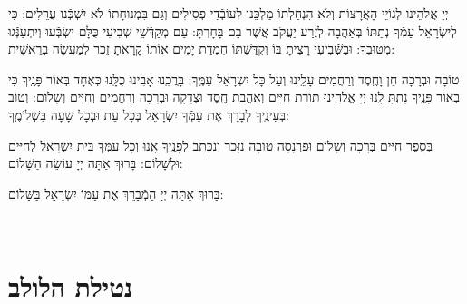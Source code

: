 \documentclass[twoside, openany, parskip=half, 11pt]{book}
\begin{document}
 יְיָ אֱלֹהֵינוּ לְגוֹיֵי הָאֲרָצוֹת וְלֹא הִנְחַלְתּוֹ מַלְכֵּנוּ לְעוֹבְֿדֵי פְסִילִים וְגַם בִּמְנוּחָתוֹ לֹא יִשְׁכְּֿנוּ עֲרֵלִים: כִּי לְיִשְׂרָאֵל עַמְּֿךָ נְתַתּוֹ בְּאַהֲבָה לְזֶרַע יַעֲקֹב אֲשֶׁר בָּם בָּחָרְתָּ: עַם מְקַדְּֿשֵׁי שְׁבִיעִי כֻּלָּם יִשְׂבְּֿעוּ וְיִתְעַנְּֿגוּ מִטּוּבֶךָ: וּבַשְּֿׁבִיעִי רָצִיתָ בּוֹ וְקִדַּשְׁתּוֹ חֶמְדַּת יָמִים אוֹתוֹ קָרָאתָ זֵכֶר לְמַעֲשֵׂה בְרֵאשִׁית:
  
\shabboskiddushhayom

\retzeh

\yaalehveyavo

\zion


\modim

\shabboschanukah

\shabboshodos  

\clearpage

\bircaskohanim

\newcommand{\shabbossimshalom}{
\firstword{שִׂים שָׁלוֹם}
 טוֹבָה וּבְרָכָה חֵן וָחֶֽסֶד וְרַחֲמִים עָלֵֽינוּ וְעַל כָּל יִשְׂרָאֵל עַמֶּֽךָ: בָּרֲכֵֽנוּ אָבִֽינוּ כֻּלָּֽנוּ כְּאֶחָד בְּאוֹר פָּנֶֽיךָ כִּי בְאוֹר פָּנֶֽיךָ נָתַֽתָּ לָֽנוּ יְיָ אֱלֹהֵֽינוּ תּוֹרַת חַיִּים וְאַהֲבַת חֶֽסֶד וּצְדָקָה וּבְרָכָה וְרַחֲמִים וְחַיִּים וְשָׁלוֹם: וְטוֹב בְּעֵינֶֽיךָ לְבָרֵךְ אֶת עַמְּֿךָ יִשְׂרָאֵל בְּכָל עֵת וּבְכָל שָׁעָה בִּשְׁלוֹמֶֽךָ:

\vspace{.4em}

\columnratio{0.7}
\begin{paracol}{2}

\instruction{בשבת שובה}
\begin{small}
 בְּסֵֽפֶר חַיִּים בְּרָכָה וְשָׁלוֹם וּפַרְנָסָה טוֹבָה נִזָּכֵר וְנִכָּתֵב לְפָנֶֽיךָ אָֽנוּ וְכָל עַמְּֿךָ בֵּית יִשְׂרָאֵל לְחַיִּים וּלְשָׁלוֹם: בָּרוּךְ אַתָּה יְיָ עוֹשֵׂה הַשָּׁלוֹם:

\end{small}
\switchcolumn
בָּרוּךְ אַתָּה יְיָ הַמְֿבָרֵךְ אֶת עַמּוֹ יִשְׂרָאֵל בַּשָּׁלוֹם:
\end{paracol}
}

\shabbossimshalom

\tachanunim

\vfill

\\
\pageref{sometimes hallel}

\clearpage

\section[נטילת הלולב]{ נטילת הלולב }
\end{document}

